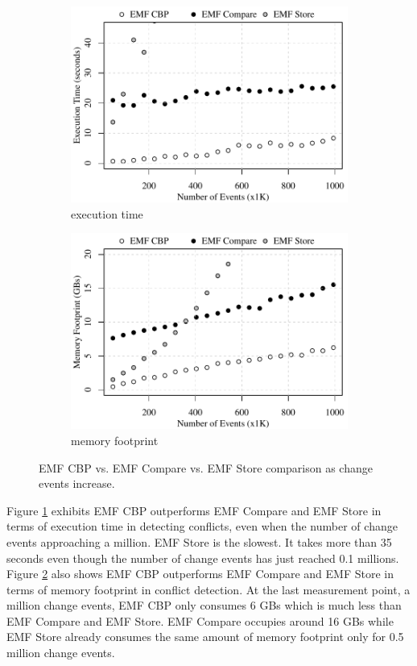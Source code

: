 \begin{figure}[ht]
\begin{subfigure}[t]{0.490\linewidth}
    \includegraphics[width=\linewidth]{conflict-time-events}
    \caption{execution time}
    \label{fig:conflict-time-events}
  \end{subfigure}
  \hfill
  \begin{subfigure}[t]{0.490\linewidth}
    \includegraphics[width=\linewidth]{conflict-memory-events}
    \caption{memory footprint}
    \label{fig:conflict-memory-events}
  \end{subfigure}
  \caption{EMF CBP vs. EMF Compare vs. EMF Store comparison as change events increase.}
  \label{fig:conflict_events}
\end{figure}

Figure \ref{fig:conflict-time-events} exhibits EMF CBP outperforms EMF Compare and EMF Store in terms of execution time in detecting conflicts, even when the number of change events approaching a million. EMF Store is the slowest. It takes more than 35 seconds even though the number of change events has just reached 0.1 millions. Figure \ref{fig:conflict-memory-events} also shows EMF CBP outperforms EMF Compare and EMF Store in terms of memory footprint in conflict detection. At the last measurement point, a million change events, EMF CBP only consumes 6 GBs which is much less than EMF Compare and EMF Store. EMF Compare occupies around 16 GBs while EMF Store already consumes the same amount of memory footprint only for 0.5 million change events.

